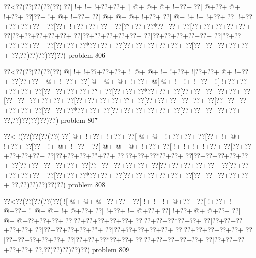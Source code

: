 \vbox{\vbox{\goo
\0??<\0??(\0??(\0??(\0??(\0??(
\0??[\- !+\- !+\- !+\0??+\0??+
\- ![\- @+\- @+\- @+\- !+\0??+
\0??[\- @+\0??+\- @+\- !+\0??+
\0??[\0??+\- !+\- @+\- !+\0??+
\0??[\- @+\- @+\- @+\- !+\0??+
\0??[\- @+\- !+\- !+\- !+\0??+
\0??[\- !+\0??+\0??+\0??+\0??+
\0??[\0??+\- !+\0??+\0??+\0??+
\0??[\0??+\0??+\0??*\0??+\0??+
\0??[\0??+\0??+\0??+\0??+\0??+
\0??[\0??+\0??+\0??+\0??+\0??+
\0??[\0??+\0??+\0??+\0??+\0??+
\0??[\0??+\0??+\0??+\0??+\0??+
\0??[\0??+\0??+\0??+\0??+\0??+
\0??[\0??+\0??+\0??*\0??+\0??+
\0??[\0??+\0??+\0??+\0??+\0??+
\0??[\0??+\0??+\0??+\0??+\0??+
\0??,\0??)\0??)\0??)\0??)\0??)
}
\hfil problem 806\hfil\break
}

\vbox{\vbox{\goo
\0??<\0??(\0??(\0??(\0??(\0??(
\- @[\- !+\- !+\0??+\0??+\0??+
\- ![\- @+\- @+\- !+\- !+\0??+
\- ![\0??+\0??+\- @+\- !+\0??+
\0??[\0??+\0??+\- @+\- !+\0??+
\0??[\- @+\- @+\- @+\- !+\0??+
\- @[\- @+\- !+\- !+\- !+\0??+
\- ![\- !+\0??+\0??+\0??+\0??+
\0??[\0??+\0??+\0??+\0??+\0??+
\0??[\0??+\0??+\0??*\0??+\0??+
\0??[\0??+\0??+\0??+\0??+\0??+
\0??[\0??+\0??+\0??+\0??+\0??+
\0??[\0??+\0??+\0??+\0??+\0??+
\0??[\0??+\0??+\0??+\0??+\0??+
\0??[\0??+\0??+\0??+\0??+\0??+
\0??[\0??+\0??+\0??*\0??+\0??+
\0??[\0??+\0??+\0??+\0??+\0??+
\0??[\0??+\0??+\0??+\0??+\0??+
\0??,\0??)\0??)\0??)\0??)\0??)
}
\hfil problem 807\hfil\break
}

\vbox{\vbox{\goo
\0??<\- !(\0??(\0??(\0??(\0??(
\0??[\- @+\- !+\0??+\- !+\0??+
\0??[\- @+\- @+\- !+\0??+\0??+
\0??[\0??+\- !+\- @+\- !+\0??+
\0??[\0??+\- !+\- @+\- !+\0??+
\0??[\- @+\- @+\- @+\- !+\0??+
\0??[\- !+\- !+\- !+\- !+\0??+
\0??[\0??+\0??+\0??+\0??+\0??+
\0??[\0??+\0??+\0??+\0??+\0??+
\0??[\0??+\0??+\0??*\0??+\0??+
\0??[\0??+\0??+\0??+\0??+\0??+
\0??[\0??+\0??+\0??+\0??+\0??+
\0??[\0??+\0??+\0??+\0??+\0??+
\0??[\0??+\0??+\0??+\0??+\0??+
\0??[\0??+\0??+\0??+\0??+\0??+
\0??[\0??+\0??+\0??*\0??+\0??+
\0??[\0??+\0??+\0??+\0??+\0??+
\0??[\0??+\0??+\0??+\0??+\0??+
\0??,\0??)\0??)\0??)\0??)\0??)
}
\hfil problem 808\hfil\break
}

\vbox{\vbox{\goo
\0??<\0??(\0??(\0??(\0??(\0??(
\- ![\- @+\- @+\- @+\0??+\0??+
\0??[\- !+\- !+\- !+\- @+\0??+
\0??[\- !+\0??+\- !+\- @+\0??+
\- ![\- @+\- @+\- !+\- @+\0??+
\0??[\- !+\0??+\- !+\- @+\0??+
\0??[\- !+\0??+\- @+\- @+\0??+
\0??[\- @+\- @+\0??+\0??+\0??+
\0??[\0??+\0??+\0??+\0??+\0??+
\0??[\0??+\0??+\0??*\0??+\0??+
\0??[\0??+\0??+\0??+\0??+\0??+
\0??[\0??+\0??+\0??+\0??+\0??+
\0??[\0??+\0??+\0??+\0??+\0??+
\0??[\0??+\0??+\0??+\0??+\0??+
\0??[\0??+\0??+\0??+\0??+\0??+
\0??[\0??+\0??+\0??*\0??+\0??+
\0??[\0??+\0??+\0??+\0??+\0??+
\0??[\0??+\0??+\0??+\0??+\0??+
\0??,\0??)\0??)\0??)\0??)\0??)
}
\hfil problem 809\hfil\break
}

